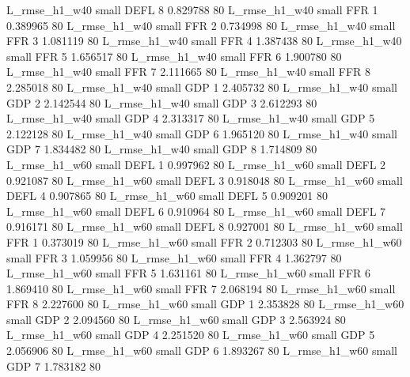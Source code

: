  L_rmse_h1_w40      small     DEFL                 8 0.829788 80
 L_rmse_h1_w40      small      FFR                 1 0.389965 80
 L_rmse_h1_w40      small      FFR                 2 0.734998 80
 L_rmse_h1_w40      small      FFR                 3 1.081119 80
 L_rmse_h1_w40      small      FFR                 4 1.387438 80
 L_rmse_h1_w40      small      FFR                 5 1.656517 80
 L_rmse_h1_w40      small      FFR                 6 1.900780 80
 L_rmse_h1_w40      small      FFR                 7 2.111665 80
 L_rmse_h1_w40      small      FFR                 8 2.285018 80
 L_rmse_h1_w40      small      GDP                 1 2.405732 80
 L_rmse_h1_w40      small      GDP                 2 2.142544 80
 L_rmse_h1_w40      small      GDP                 3 2.612293 80
 L_rmse_h1_w40      small      GDP                 4 2.313317 80
 L_rmse_h1_w40      small      GDP                 5 2.122128 80
 L_rmse_h1_w40      small      GDP                 6 1.965120 80
 L_rmse_h1_w40      small      GDP                 7 1.834482 80
 L_rmse_h1_w40      small      GDP                 8 1.714809 80
 L_rmse_h1_w60      small     DEFL                 1 0.997962 80
 L_rmse_h1_w60      small     DEFL                 2 0.921087 80
 L_rmse_h1_w60      small     DEFL                 3 0.918048 80
 L_rmse_h1_w60      small     DEFL                 4 0.907865 80
 L_rmse_h1_w60      small     DEFL                 5 0.909201 80
 L_rmse_h1_w60      small     DEFL                 6 0.910964 80
 L_rmse_h1_w60      small     DEFL                 7 0.916171 80
 L_rmse_h1_w60      small     DEFL                 8 0.927001 80
 L_rmse_h1_w60      small      FFR                 1 0.373019 80
 L_rmse_h1_w60      small      FFR                 2 0.712303 80
 L_rmse_h1_w60      small      FFR                 3 1.059956 80
 L_rmse_h1_w60      small      FFR                 4 1.362797 80
 L_rmse_h1_w60      small      FFR                 5 1.631161 80
 L_rmse_h1_w60      small      FFR                 6 1.869410 80
 L_rmse_h1_w60      small      FFR                 7 2.068194 80
 L_rmse_h1_w60      small      FFR                 8 2.227600 80
 L_rmse_h1_w60      small      GDP                 1 2.353828 80
 L_rmse_h1_w60      small      GDP                 2 2.094560 80
 L_rmse_h1_w60      small      GDP                 3 2.563924 80
 L_rmse_h1_w60      small      GDP                 4 2.251520 80
 L_rmse_h1_w60      small      GDP                 5 2.056906 80
 L_rmse_h1_w60      small      GDP                 6 1.893267 80
 L_rmse_h1_w60      small      GDP                 7 1.783182 80
